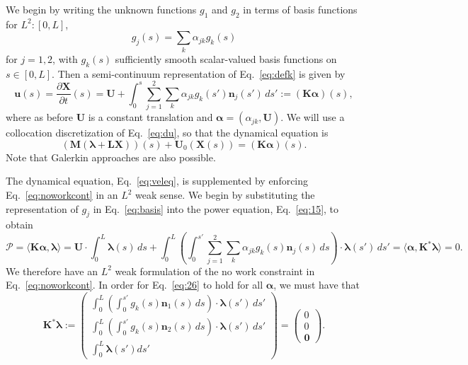 We begin by writing the unknown functions $g_1$ and $g_2$ in terms of basis functions for $L^2:[0,L]$, 
\begin{equation}
\label{eq:basis}
g_j(s) = \sum_k \alpha_{jk} g_k(s)
\end{equation}
for $j=1, 2$, with $g_k(s)$ sufficiently smooth scalar-valued basis functions on $s \in [0,L]$. Then a semi-continuum representation of Eq.\ \eqref{eq:defk} is given by 
\begin{equation}
\label{eq:du}
   \bm{u}(s)=\frac{\partial \bm{X}}{\partial t}(s) =\bm{U} + \int_0^s \sum_{j=1}^2\sum_k \alpha_{jk} g_k(s') \bm{n}_j(s') \, ds':=(\bm{K}\bm{\alpha})(s),
\end{equation}
where as before $\bm{U}$ is a constant translation and $\bm{\alpha}=(\alpha_{jk},\bm{U})$. We will use a collocation discretization of Eq.\ \eqref{eq:du}, so that the dynamical equation is
\begin{equation}
    \label{eq:veleq}
    \left(\bm{M}(\bm{\lambda} +\bm{L}\bm{X})\right)(s) +\bm{U}_0(\bm{X}(s))= \left(\bm{K} \bm{\alpha}\right)(s). 
\end{equation}
Note that Galerkin approaches are also possible. 

The dynamical equation, Eq.\ \eqref{eq:veleq}, is supplemented by enforcing Eq.\ \eqref{eq:noworkcont} in an $L^2$ weak sense. We begin by substituting the representation of $g_j$ in Eq.\ \eqref{eq:basis} into the power equation, Eq.\ \eqref{eq:15}, to obtain 
\begin{equation}
\label{eq:26}
\mathcal{P} = \langle\bm{K}\bm{\alpha},\bm{\lambda}\rangle=\bm{U} \cdot \int_0^L \bm{\lambda}(s) \, ds + \int_0^L \left(\int_0^{s'} \sum_{j=1}^2\sum_{k} \alpha_{jk} g_k(s) \bm{n}_j(s) \, ds\right)\cdot \bm{\lambda}(s') \, ds' =\langle \bm{\alpha},\bm{K}^*\bm{\lambda}\rangle =0. 
\end{equation}
We therefore have an $L^2$ weak formulation of the no work constraint in Eq.\ \eqref{eq:noworkcont}. In order for Eq.\ \eqref{eq:26} to hold for all $\bm{\alpha}$, we must have that 
\begin{equation}
\label{eq:noworkcontL2}
\bm{K}^* \bm{\lambda}:=\begin{pmatrix} \int_0^L \left(\int_0^{s'} g_k(s) \bm{n}_1(s) \, ds\right)\cdot \bm{\lambda}(s') \, ds'\\[2 pt] \int_0^L \left(\int_0^{s'} g_k(s) \bm{n}_2(s) \, ds\right)\cdot \bm{\lambda}(s') \, ds'\\[2 pt] \int_0^L \bm{\lambda}(s') ds' \end{pmatrix} = \begin{pmatrix} 0 \\[2 pt] 0\\[2 pt] \bm{0}\end{pmatrix}. 
\end{equation}

